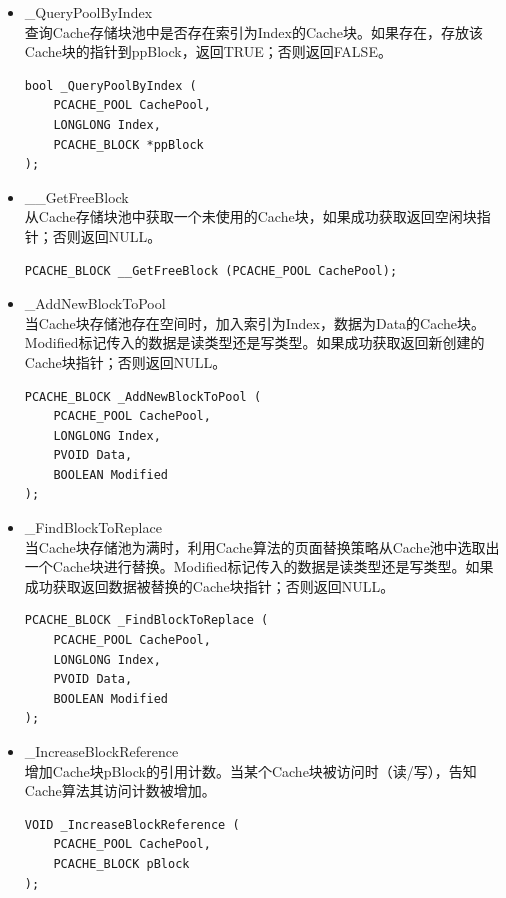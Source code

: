 \begin{itemize}

\item \_QueryPoolByIndex
\\查询Cache存储块池中是否存在索引为Index的Cache块。如果存在，存放该Cache块的指针到ppBlock，返回TRUE；否则返回FALSE。
\begin{lstlisting}
bool _QueryPoolByIndex (
    PCACHE_POOL CachePool,
    LONGLONG Index,
    PCACHE_BLOCK *ppBlock
);
\end{lstlisting}

\item \_\_GetFreeBlock
\\从Cache存储块池中获取一个未使用的Cache块，如果成功获取返回空闲块指针；否则返回NULL。
\begin{lstlisting}
PCACHE_BLOCK __GetFreeBlock (PCACHE_POOL CachePool);
\end{lstlisting}

\item \_AddNewBlockToPool
\\当Cache块存储池存在空间时，加入索引为Index，数据为Data的Cache块。Modified标记传入的数据是读类型还是写类型。如果成功获取返回新创建的Cache块指针；否则返回NULL。
\begin{lstlisting}
PCACHE_BLOCK _AddNewBlockToPool (
    PCACHE_POOL CachePool,
    LONGLONG Index,
    PVOID Data,
    BOOLEAN Modified
);
\end{lstlisting}

\item \_FindBlockToReplace
\\当Cache块存储池为满时，利用Cache算法的页面替换策略从Cache池中选取出一个Cache块进行替换。Modified标记传入的数据是读类型还是写类型。如果成功获取返回数据被替换的Cache块指针；否则返回NULL。
\begin{lstlisting}
PCACHE_BLOCK _FindBlockToReplace (
    PCACHE_POOL CachePool,
    LONGLONG Index,
    PVOID Data,
    BOOLEAN Modified
);
\end{lstlisting}

\item \_IncreaseBlockReference
\\增加Cache块pBlock的引用计数。当某个Cache块被访问时（读/写），告知Cache算法其访问计数被增加。
\begin{lstlisting}
VOID _IncreaseBlockReference (
    PCACHE_POOL CachePool,
    PCACHE_BLOCK pBlock
);
\end{lstlisting}

\end{itemize}

